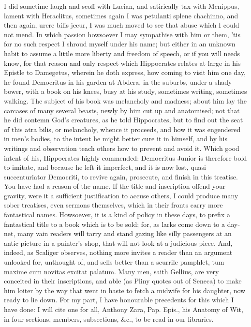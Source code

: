 {I did sometime laugh and scoff with Lucian, and satirically tax with
Menippus, lament with Heraclitus, sometimes again I was petulanti
splene chachinno, and then again, urere bilis jecur, I was much
moved to see that abuse which I could not mend. In which passion
howsoever I may sympathise with him or them, 'tis for no such respect I
shroud myself under his name; but either in an unknown habit to assume
a little more liberty and freedom of speech, or if you will needs know,
for that reason and only respect which Hippocrates relates at large in
his Epistle to Damegetus, wherein he doth express, how coming to visit
him one day, he found Democritus in his garden at Abdera, in the
suburbs, under a shady bower, with a book on his knees, busy at
his study, sometimes writing, sometimes walking. The subject of his
book was melancholy and madness; about him lay the carcases of many
several beasts, newly by him cut up and anatomised; not that he did
contemn God's creatures, as he told Hippocrates, but to find out the
seat of this atra bilis, or melancholy, whence it proceeds, and how it
was engendered in men's bodies, to the intent he might better cure it
in himself, and by his writings and observation teach others how to
prevent and avoid it. Which good intent of his, Hippocrates highly
commended: Democritus Junior is therefore bold to imitate, and because
he left it imperfect, and it is now lost, quasi succenturiator
Democriti, to revive again, prosecute, and finish in this treatise.
You have had a reason of the name. If the title and inscription offend
your gravity, were it a sufficient justification to accuse others, I
could produce many sober treatises, even sermons themselves, which in
their fronts carry more fantastical names. Howsoever, it is a kind of
policy in these days, to prefix a fantastical title to a book which is
to be sold; for, as larks come down to a day-net, many vain readers
will tarry and stand gazing like silly passengers at an antic picture
in a painter's shop, that will not look at a judicious piece. And,
indeed, as Scaliger observes, nothing more invites a reader than an
argument unlooked for, unthought of, and sells better than a scurrile
pamphlet, tum maxime cum novitas excitat palatum. Many men, saith
Gellius, are very conceited in their inscriptions, and able (as
Pliny quotes out of Seneca) to make him loiter by the way that went
in haste to fetch a midwife for his daughter, now ready to lie down.
For my part, I have honourable precedents for this which I have
done: I will cite one for all, Anthony Zara, Pap. Epis., his Anatomy of
Wit, in four sections, members, subsections, \&c., to be read in our
libraries.

}
